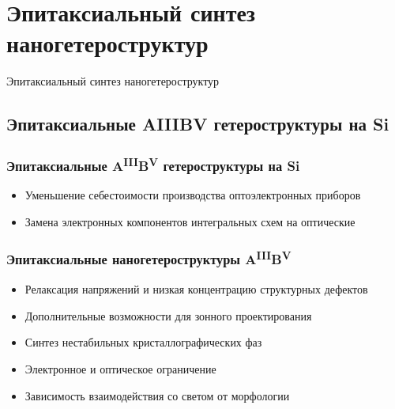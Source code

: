 \section{Эпитаксиальный синтез наногетероструктур}
\begin{frame}
	\begin{center}
		\Huge
		Эпитаксиальный синтез наногетероструктур
	\end{center}
\end{frame}

\subsection{Эпитаксиальные AIIIBV гетероструктуры на Si}

\begin{frame}
	\frametitle{Эпитаксиальные A\textsuperscript{III}B\textsuperscript{V} гетероструктуры на Si}
	\begin{itemize}
		\item Уменьшение себестоимости производства оптоэлектронных приборов
		\item Замена электронных компонентов интегральных схем на оптические
	\end{itemize}
\end{frame}

\begin{frame}
	\frametitle{Эпитаксиальные наногетероструктуры A\textsuperscript{III}B\textsuperscript{V}}
	\begin{itemize}
		\item Релаксация напряжений и низкая концентрацию структурных дефектов
		\item Дополнительные возможности для зонного проектирования
		\item Синтез нестабильных кристаллографических фаз
		\item Электронное и оптическое ограничение
		\item Зависимость взаимодействия со светом от морфологии
	\end{itemize}
\end{frame}

